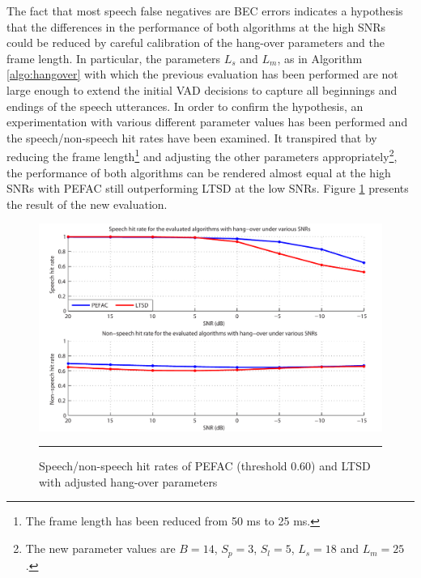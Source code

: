 The fact that most speech false negatives are BEC errors indicates a hypothesis that the differences in the performance of both algorithms at the high SNRs could be reduced by careful calibration of the hang-over parameters and the frame length. In particular, the parameters $L_s$ and $L_m$, as in Algorithm \ref{algo:hangover} with which the previous evaluation has been performed are not large enough to extend the initial VAD decisions to capture all beginnings and endings of the speech utterances. In order to confirm the hypothesis, an experimentation with various different parameter values has been performed and the speech/non-speech hit rates have been examined. It transpired that by reducing the frame length\footnote{The frame length has been reduced from 50 ms to 25 ms.} and adjusting the other parameters appropriately\footnote{The new parameter values are $B=14$, $S_p=3$, $S_l=5$, $L_s=18$ and $L_m=25$.}, the performance of both algorithms can be rendered almost equal at the high SNRs with PEFAC still outperforming LTSD at the low SNRs. Figure \ref{fig:diffhangpars} presents the result of the new evaluation.

\begin{figure}[htbp]
	\centering
		\includegraphics[width=0.9\columnwidth]{Figures/Chapter5/diffhangpars.pdf}
		\rule{37em}{0.5pt}
	\caption[Speech/non-speech hit rates of PEFAC (threshold 0.60) and LTSD with adjusted hang-over parameters]{Speech/non-speech hit rates of PEFAC (threshold 0.60) and LTSD with adjusted hang-over parameters}
	\label{fig:diffhangpars}
\end{figure}


